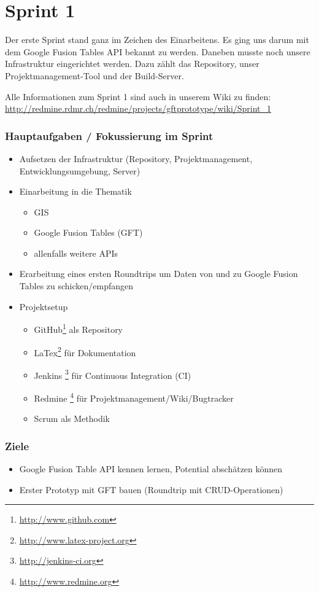 \section{Sprint 1}

Der erste Sprint stand ganz im Zeichen des Einarbeitens. Es ging uns darum mit dem Google Fusion Tables \gls{API} bekannt zu werden. Daneben musste noch unsere Infrastruktur eingerichtet werden. Dazu zählt das Repository, unser Projektmanagement-Tool und der Build-Server.

Alle Informationen zum Sprint 1 sind auch in unserem Wiki zu finden:
\url{http://redmine.rdmr.ch/redmine/projects/gftprototype/wiki/Sprint_1}

\subsubsection{Hauptaufgaben / Fokussierung im Sprint}

\begin{itemize}
	\item Aufsetzen der Infrastruktur (Repository, Projektmanagement, Entwicklungsumgebung, Server)
	\item Einarbeitung in die Thematik
	\begin{itemize}
		\item \gls{GIS}
		\item Google Fusion Tables (GFT)
		\item allenfalls weitere \gls{API}s
	\end{itemize}
	\item Erarbeitung eines ersten Roundtrips um Daten von und zu Google Fusion Tables zu schicken/empfangen
	\item Projektsetup
	\begin{itemize}
		\item GitHub\footnote{\url{http://www.github.com}} als Repository
		\item LaTex\footnote{\url{http://www.latex-project.org}} für Dokumentation
		\item Jenkins \footnote{\url{http://jenkins-ci.org}} für Continuous Integration (CI)
		\item Redmine \footnote{\url{http://www.redmine.org}} für Projektmanagement/Wiki/Bugtracker
		\item Scrum als Methodik
	\end{itemize}
\end{itemize}

\subsubsection{Ziele}
\begin{itemize}
	\item Google Fusion Table \gls{API} kennen lernen, Potential abschätzen können
	\item Erster Prototyp mit GFT bauen (Roundtrip mit \gls{CRUD}-Operationen)
\end{itemize}


